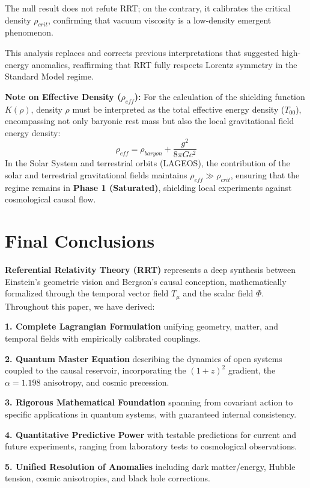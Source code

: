 \documentclass[10pt, a4paper]{article}
\begin{document}
The null result does not refute RRT; on the contrary, it calibrates the critical density $\rho_{crit}$, confirming that vacuum viscosity is a low-density emergent phenomenon.

This analysis replaces and corrects previous interpretations that suggested high-energy anomalies, reaffirming that RRT fully respects Lorentz symmetry in the Standard Model regime.

\textbf{Note on Effective Density ($\rho_{eff}$):}
For the calculation of the shielding function $K(\rho)$, density $\rho$ must be interpreted as the total effective energy density ($T_{00}$), encompassing not only baryonic rest mass but also the local gravitational field energy density:
\begin{equation}
\rho_{eff} = \rho_{baryon} + \frac{g^2}{8\pi G c^2}
\end{equation}
In the Solar System and terrestrial orbits (LAGEOS), the contribution of the solar and terrestrial gravitational fields maintains $\rho_{eff} \gg \rho_{crit}$, ensuring that the regime remains in \textbf{Phase 1 (Saturated)}, shielding local experiments against cosmological causal flow.

\section*{Final Conclusions}

\textbf{Referential Relativity Theory (RRT)} represents a deep synthesis between Einstein's geometric vision and Bergson's causal conception, mathematically formalized through the temporal vector field $T_\mu$ and the scalar field $\Phi$. Throughout this paper, we have derived:

\textbf{1. Complete Lagrangian Formulation} unifying geometry, matter, and temporal fields with empirically calibrated couplings.

\textbf{2. Quantum Master Equation} describing the dynamics of open systems coupled to the causal reservoir, incorporating the $(1+z)^2$ gradient, the $\alpha=1.198$ anisotropy, and cosmic precession.

\textbf{3. Rigorous Mathematical Foundation} spanning from covariant action to specific applications in quantum systems, with guaranteed internal consistency.

\textbf{4. Quantitative Predictive Power} with testable predictions for current and future experiments, ranging from laboratory tests to cosmological observations.

\textbf{5. Unified Resolution of Anomalies} including dark matter/energy, Hubble tension, cosmic anisotropies, and black hole corrections.
\end{document}

